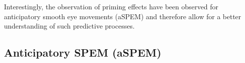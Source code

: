 \documentclass[profile,final,english,draft]{article}%
\begin{document}
Interestingly, the observation of priming effects
have been observed for anticipatory smooth eye movements (aSPEM)
and therefore allow for a better understanding of such predictive processes. %
\subsection{Anticipatory SPEM (aSPEM)}
\begin{figure}%
\end{figure}
\end{document}

